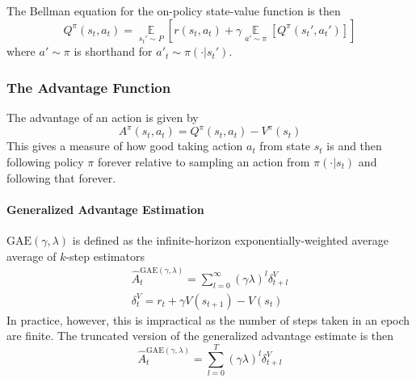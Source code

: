 The Bellman equation for the on-policy state-value function is then
\begin{equation}
    Q^\pi(s_t, a_t)
    =
    \operatorname*{\mathbb{E}}\limits_{s_t'\sim{P}}
    \left[
        r(s_t, a_t) + \gamma
        \operatorname*{\mathbb{E}}\limits_{a'\sim{\pi}}
        \left[
            Q^\pi(s_t', a_t')
        \right]
    \right]
\end{equation}
where $a'\sim{\pi}$ is shorthand for $a'_t \sim \pi(\cdot|s_t')$.

\subsubsection{The Advantage Function}

The advantage of an action is given by
\begin{equation}
    A^\pi(s_t, a_t) = Q^\pi(s_t, a_t) - V^\pi(s_t)
\end{equation}
This gives a measure of how good taking action $a_t$ from state $s_t$ is and then following policy $\pi$ forever relative to sampling an action from $\pi(\cdot|s_t)$ and following that forever.

\paragraph{Generalized Advantage Estimation}

$\mathrm{GAE}(\gamma, \lambda)$ is defined as the infinite-horizon exponentially-weighted average average of $k$-step estimators
\begin{equation}
    \begin{gathered}
        \hat A_t^{\mathrm{GAE}(\gamma, \lambda)} = \sum^\infty_{l=0} (\gamma \lambda)^l \delta^V_{t+l} \\
        \delta^V_t = r_t + \gamma V(s_{t+1}) - V(s_t)
    \end{gathered}
\end{equation}
In practice, however, this is impractical as the number of steps taken in an epoch are finite. The truncated version of the generalized advantage estimate is then
\begin{equation}
    \hat A_t^{\mathrm{GAE}(\gamma, \lambda)} = \sum^T_{l=0} (\gamma \lambda)^l \delta^V_{t+l}
\end{equation}

\cite{schulman_highdimensional_2018}


